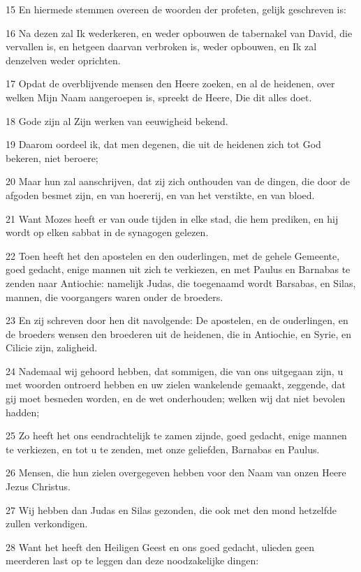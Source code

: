 \par 15 En hiermede stemmen overeen de woorden der profeten, gelijk geschreven is:
\par 16 Na dezen zal Ik wederkeren, en weder opbouwen de tabernakel van David, die vervallen is, en hetgeen daarvan verbroken is, weder opbouwen, en Ik zal denzelven weder oprichten.
\par 17 Opdat de overblijvende mensen den Heere zoeken, en al de heidenen, over welken Mijn Naam aangeroepen is, spreekt de Heere, Die dit alles doet.
\par 18 Gode zijn al Zijn werken van eeuwigheid bekend.
\par 19 Daarom oordeel ik, dat men degenen, die uit de heidenen zich tot God bekeren, niet beroere;
\par 20 Maar hun zal aanschrijven, dat zij zich onthouden van de dingen, die door de afgoden besmet zijn, en van hoererij, en van het verstikte, en van bloed.
\par 21 Want Mozes heeft er van oude tijden in elke stad, die hem prediken, en hij wordt op elken sabbat in de synagogen gelezen.
\par 22 Toen heeft het den apostelen en den ouderlingen, met de gehele Gemeente, goed gedacht, enige mannen uit zich te verkiezen, en met Paulus en Barnabas te zenden naar Antiochie: namelijk Judas, die toegenaamd wordt Barsabas, en Silas, mannen, die voorgangers waren onder de broeders.
\par 23 En zij schreven door hen dit navolgende: De apostelen, en de ouderlingen, en de broeders wensen den broederen uit de heidenen, die in Antiochie, en Syrie, en Cilicie zijn, zaligheid.
\par 24 Nademaal wij gehoord hebben, dat sommigen, die van ons uitgegaan zijn, u met woorden ontroerd hebben en uw zielen wankelende gemaakt, zeggende, dat gij moet besneden worden, en de wet onderhouden; welken wij dat niet bevolen hadden;
\par 25 Zo heeft het ons eendrachtelijk te zamen zijnde, goed gedacht, enige mannen te verkiezen, en tot u te zenden, met onze geliefden, Barnabas en Paulus.
\par 26 Mensen, die hun zielen overgegeven hebben voor den Naam van onzen Heere Jezus Christus.
\par 27 Wij hebben dan Judas en Silas gezonden, die ook met den mond hetzelfde zullen verkondigen.
\par 28 Want het heeft den Heiligen Geest en ons goed gedacht, ulieden geen meerderen last op te leggen dan deze noodzakelijke dingen:
